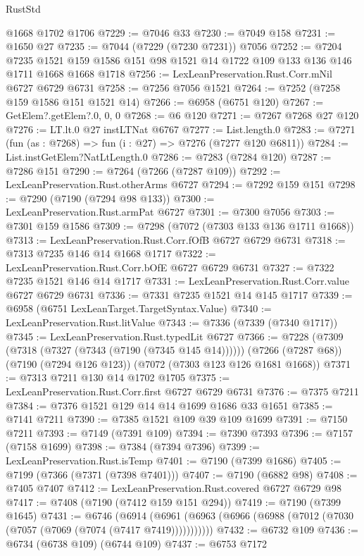 \begin{lexlean}{RustStd}
\begin{coremodule}
    @1668
    @1702
    @1706
@7229 := @7046 @33
@7230 := @7049 @158
@7231 := @1650 @27
@7235 := @7044 (@7229 (@7230 @7231)) @7056
@7252 := @7204
    @7235
    @1521
    @159
    @1586
    @151
    @98
    @1521
    @14
    @1722
    @109
    @133
    @136
    @146
    @1711
    @1668
    @1668
    @1718
@7256 := LexLeanPreservation.Rust.Corr.mNil @6727 @6729 @6731
@7258 := @7256 @7056 @1521
@7264 := @7252 (@7258 @159 @1586 @151 @1521 @14)
@7266 := @6958 (@6751 @120)
@7267 := GetElem?.getElem?.{0, 0, 0}
@7268 := @6 @120
@7271 := @7267 @7268 @27 @120
@7276 := LT.lt.{0} @27 instLTNat @6767
@7277 := List.length.{0}
@7283 := @7271 (fun (as : @7268) => fun (i : @27) => @7276 (@7277 @120 @6811))
@7284 := List.instGetElem?NatLtLength.{0}
@7286 := @7283 (@7284 @120)
@7287 := @7286 @151
@7290 := @7264 (@7266 (@7287 @109))
@7292 := LexLeanPreservation.Rust.otherArms @6727
@7294 := @7292 @159 @151
@7298 := @7290 (@7190 (@7294 @98 @133))
@7300 := LexLeanPreservation.Rust.armPat @6727
@7301 := @7300 @7056
@7303 := @7301 @159 @1586
@7309 := @7298 (@7072 (@7303 @133 @136 @1711 @1668))
@7313 := LexLeanPreservation.Rust.Corr.fOfB @6727 @6729 @6731
@7318 := @7313 @7235 @146 @14 @1668 @1717
@7322 := LexLeanPreservation.Rust.Corr.bOfE @6727 @6729 @6731
@7327 := @7322 @7235 @1521 @146 @14 @1717
@7331 := LexLeanPreservation.Rust.Corr.value @6727 @6729 @6731
@7336 := @7331 @7235 @1521 @14 @145 @1717
@7339 := @6958 (@6751 LexLeanTarget.TargetSyntax.Value)
@7340 := LexLeanPreservation.Rust.litValue
@7343 := @7336 (@7339 (@7340 @1717))
@7345 := LexLeanPreservation.Rust.typedLit @6727
@7366 := @7228
    (@7309 (@7318 (@7327 (@7343 (@7190 (@7345 @145 @14))))))
    (@7266 (@7287 @68))
    (@7190 (@7294 @126 @123))
    (@7072 (@7303 @123 @126 @1681 @1668))
@7371 := @7313 @7211 @130 @14 @1702 @1705
@7375 := LexLeanPreservation.Rust.Corr.first @6727 @6729 @6731
@7376 := @7375 @7211
@7384 := @7376 @1521 @129 @14 @14 @1699 @1686 @33 @1651
@7385 := @7141 @7211
@7390 := @7385 @1521 @109 @39 @109 @1699
@7391 := @7150 @7211
@7393 := @7149 (@7391 @109)
@7394 := @7390 @7393
@7396 := @7157 (@7158 @1699)
@7398 := @7384 (@7394 @7396)
@7399 := LexLeanPreservation.Rust.isTemp
@7401 := @7190 (@7399 @1686)
@7405 := @7199 (@7366 (@7371 (@7398 @7401)))
@7407 := @7190 (@6882 @98)
@7408 := @7405 @7407
@7412 := LexLeanPreservation.Rust.covered @6727 @6729 @98
@7417 := @7408 (@7190 (@7412 @159 @151 @294))
@7419 := @7190 (@7399 @1645)
@7431 := @6746
    (@6914 (@6961 (@6963 (@6966 (@6988 (@7012 (@7030 (@7057 (@7069 (@7074 (@7417 @7419)))))))))))
@7432 := @6732 @109
@7436 := @6734 (@6738 @109) (@6744 @109)
@7437 := @6753 @7172

\end{coremodule}
\end{lexlean}
